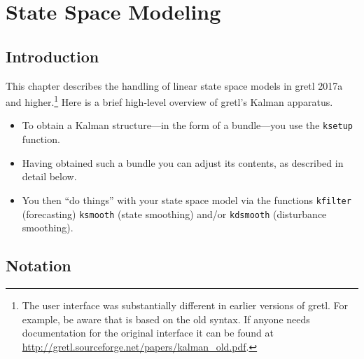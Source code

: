 \newcommand{\obsvec}{y}
\newcommand{\obsymat}{Z}
\newcommand{\obsx}{x}
\newcommand{\obsxmat}{B}
\newcommand{\obsdist}{\varepsilon}
\newcommand{\obsvar}{R}
\newcommand{\obsdim}{n}

\newcommand{\statevec}{\alpha}
\newcommand{\statecvar}{P}
\newcommand{\statemat}{T}
\newcommand{\strdist}{\eta}
\newcommand{\statevar}{Q}
\newcommand{\gain}{K}
\newcommand{\statemu}{\mu}
\newcommand{\stdim}{r}

\newcommand{\altstatevar}{H}
\newcommand{\altobsvar}{G}
\newcommand{\alldist}{\varepsilon}
\newcommand{\alldim}{p}

\newcommand{\prederr}{v}
\newcommand{\predvar}{F}

\newcommand{\myvec}{\mbox{vec}}
\newcommand{\myvech}{\mbox{vech}}

\chapter{State Space Modeling}
\label{chap:kalman}

\section{Introduction}
\label{sec:amble}

This chapter describes the handling of linear state space models in
gretl 2017a and higher.\footnote{The user interface was substantially
  different in earlier versions of gretl.  For example, be aware that
  \cite{lucchetti11} is based on the old syntax. If anyone needs
  documentation for the original interface it can be found at
  \url{http://gretl.sourceforge.net/papers/kalman_old.pdf}.}  Here is
a brief high-level overview of gretl's Kalman apparatus.
%
\begin{itemize}
\item To obtain a Kalman structure---in the form of a bundle---you use
  the \texttt{ksetup} function.
\item Having obtained such a bundle you can adjust its contents, as
  described in detail below.
\item You then ``do things'' with your state space model via the
  functions \texttt{kfilter} (forecasting) \texttt{ksmooth} (state
  smoothing) and/or \texttt{kdsmooth} (disturbance smoothing).
\end{itemize}

\section{Notation}

